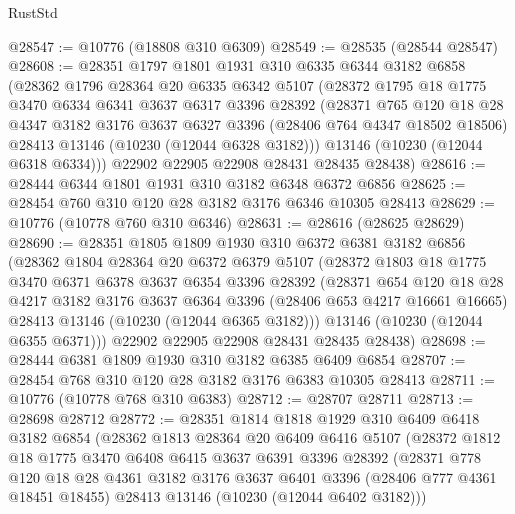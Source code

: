 \begin{lexlean}{RustStd}
\begin{coremodule}
@28547 := @10776 (@18808 @310 @6309)
@28549 := @28535 (@28544 @28547)
@28608 := @28351
    @1797
    @1801
    @1931
    @310
    @6335
    @6344
    @3182
    @6858
    (@28362
      @1796
      @28364
      @20
      @6335
      @6342
      @5107
      (@28372
        @1795
        @18
        @1775
        @3470
        @6334
        @6341
        @3637
        @6317
        @3396
        @28392
        (@28371
          @765
          @120
          @18
          @28
          @4347
          @3182
          @3176
          @3637
          @6327
          @3396
          (@28406 @764 @4347 @18502 @18506)
          @28413
          @13146
          (@10230 (@12044 @6328 @3182)))
        @13146
        (@10230 (@12044 @6318 @6334)))
      @22902
      @22905
      @22908
      @28431
      @28435
      @28438)
@28616 := @28444 @6344 @1801 @1931 @310 @3182 @6348 @6372 @6856
@28625 := @28454 @760 @310 @120 @28 @3182 @3176 @6346 @10305 @28413
@28629 := @10776 (@10778 @760 @310 @6346)
@28631 := @28616 (@28625 @28629)
@28690 := @28351
    @1805
    @1809
    @1930
    @310
    @6372
    @6381
    @3182
    @6856
    (@28362
      @1804
      @28364
      @20
      @6372
      @6379
      @5107
      (@28372
        @1803
        @18
        @1775
        @3470
        @6371
        @6378
        @3637
        @6354
        @3396
        @28392
        (@28371
          @654
          @120
          @18
          @28
          @4217
          @3182
          @3176
          @3637
          @6364
          @3396
          (@28406 @653 @4217 @16661 @16665)
          @28413
          @13146
          (@10230 (@12044 @6365 @3182)))
        @13146
        (@10230 (@12044 @6355 @6371)))
      @22902
      @22905
      @22908
      @28431
      @28435
      @28438)
@28698 := @28444 @6381 @1809 @1930 @310 @3182 @6385 @6409 @6854
@28707 := @28454 @768 @310 @120 @28 @3182 @3176 @6383 @10305 @28413
@28711 := @10776 (@10778 @768 @310 @6383)
@28712 := @28707 @28711
@28713 := @28698 @28712
@28772 := @28351
    @1814
    @1818
    @1929
    @310
    @6409
    @6418
    @3182
    @6854
    (@28362
      @1813
      @28364
      @20
      @6409
      @6416
      @5107
      (@28372
        @1812
        @18
        @1775
        @3470
        @6408
        @6415
        @3637
        @6391
        @3396
        @28392
        (@28371
          @778
          @120
          @18
          @28
          @4361
          @3182
          @3176
          @3637
          @6401
          @3396
          (@28406 @777 @4361 @18451 @18455)
          @28413
          @13146
          (@10230 (@12044 @6402 @3182)))

\end{coremodule}
\end{lexlean}
